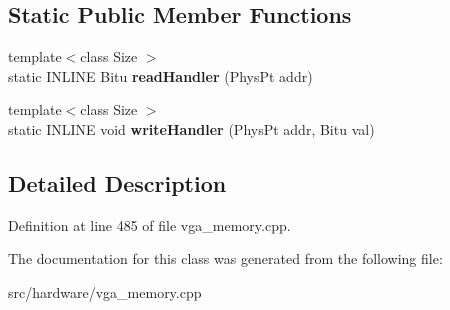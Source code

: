 \subsection*{Static Public Member Functions}
\begin{DoxyCompactItemize}
\item 
\hypertarget{classVGA__ET4000__ChainedVGA__Handler_a1d35517681972c67a6727cd1287464f1}{{\footnotesize template$<$class Size $>$ }\\static I\-N\-L\-I\-N\-E Bitu {\bfseries read\-Handler} (Phys\-Pt addr)}\label{classVGA__ET4000__ChainedVGA__Handler_a1d35517681972c67a6727cd1287464f1}

\item 
\hypertarget{classVGA__ET4000__ChainedVGA__Handler_afaf78e28d620531103293402429f6047}{{\footnotesize template$<$class Size $>$ }\\static I\-N\-L\-I\-N\-E void {\bfseries write\-Handler} (Phys\-Pt addr, Bitu val)}\label{classVGA__ET4000__ChainedVGA__Handler_afaf78e28d620531103293402429f6047}

\end{DoxyCompactItemize}


\subsection{Detailed Description}


Definition at line 485 of file vga\-\_\-memory.\-cpp.



The documentation for this class was generated from the following file\-:\begin{DoxyCompactItemize}
\item 
src/hardware/vga\-\_\-memory.\-cpp\end{DoxyCompactItemize}
